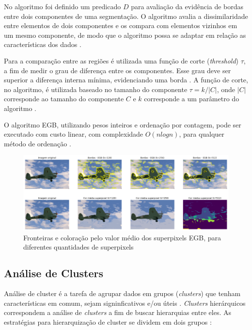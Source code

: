 \begin{document}
No algoritmo foi definido um predicado $D$ para avaliação da evidência de bordas entre dois componentes de uma segmentação. O algoritmo avalia a dissimilaridade entre elementos de dois componentes e os compara com elementos vizinhos em um mesmo componente, de modo que o algoritmo possa se adaptar em relação as características dos dados \cite{FELZENSZWALB}. 

Para a comparação entre as regiões é utilizada uma função de corte (\textit{threshold}) $\tau$, a fim de medir o grau de diferença entre os componentes. Esse grau deve ser superior a diferença interna mínima, evidenciando uma borda \cite{FELZENSZWALB}. A função de corte, no algoritmo, é utilizada baseado no tamanho do componente $\tau=k/|C|$, onde $|C|$ corresponde ao tamanho do componente $C$ e $k$ corresponde a um parâmetro do algoritmo \cite{FELZENSZWALB}.

O algoritmo EGB, utilizando pesos inteiros e ordenação por contagem, pode ser executado com custo linear, com complexidade $O(nlogn)$, para qualquer método de ordenação \cite{FELZENSZWALB}. 

\begin{figure}[ht]
\centering
\includegraphics[width=1.\textwidth]{felz_segmentation_compare.png}
\caption{Fronteiras e coloração pelo valor médio dos superpixels EGB, para diferentes quantidades de superpixels}
\label{fig:EGB}
\end{figure}


\subsection{Análise de Clusters} \label{ssec:clusters}

Análise de cluster é a tarefa de agrupar dados em grupos (\textit{clusters}) que tenham características em comum, sejam signinficativos e/ou úteis \cite{CLUSTER_HIER}. \textit{Clusters} hierárquicos correspondem a análise de \textit{clusters} a fim de buscar hierarquias entre eles. As estratégias para hierarquização de cluster se dividem em dois grupos \cite{ROKACH}:
\end{document}
